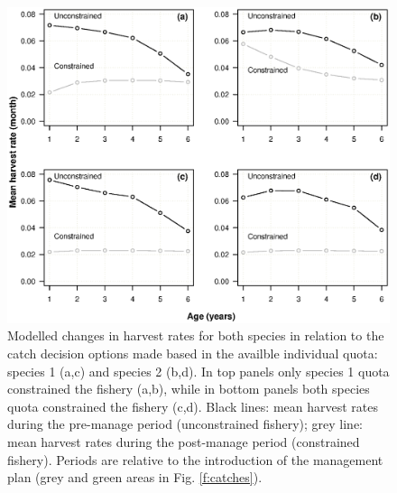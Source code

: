 \documentclass[12pt,oneline,a4paper,numbib]{ouparticle}
\numberwithin{equation}{subsection} %
\begin{document}
\begin{figure}[!ht]
\centering
\includegraphics[width=\textwidth]{Figures/Selectivity.eps} 
\caption{Modelled changes in harvest rates for both species in relation to the catch decision options made based in the availble individual quota: species 1 (a,c) and species 2 (b,d). In top panels only species 1 quota constrained the fishery (a,b), while in bottom panels both species quota constrained the fishery (c,d). Black lines: mean harvest rates during the pre-manage period (unconstrained fishery); grey line: mean harvest rates during the post-manage period (constrained fishery). Periods are relative to the introduction of the management plan (grey and green areas in Fig. \ref{f:catches}).}
\label{f:selectivity}
\end{figure}
\end{document}
